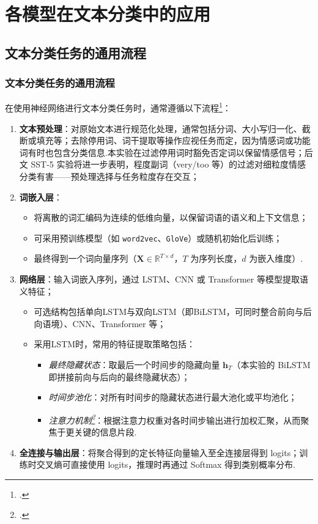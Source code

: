 \documentclass{模版}
\begin{document}
\section{各模型在文本分类中的应用}
\subsection{文本分类任务的通用流程}
\begin{frame}\frametitle{文本分类任务的通用流程}
\footnotesize
在使用神经网络进行文本分类任务时，通常遵循以下流程\footcite{raoActionablePoliticalText2016,wangLSTMApproachShort2018}：
\begin{enumerate}
    \item \textbf{文本预处理}：对原始文本进行规范化处理，通常包括分词、大小写归一化、截断或填充等；去除停用词、词干提取等操作应视任务而定，因为情感词或功能词有时也包含分类信息.本实验在过滤停用词时豁免否定词以保留情感信号；后文 SST-5 实验将进一步表明，程度副词（very/too 等）的过滤对细粒度情感分类有害——预处理选择与任务粒度存在交互；
    \item \textbf{词嵌入层}：
    \begin{itemize}
        \item 将离散的词汇编码为连续的低维向量，以保留词语的语义和上下文信息；
        \item 可采用预训练模型（如 \texttt{word2vec}、\texttt{GloVe}）或随机初始化后训练；
        \item 最终得到一个词向量序列（$\symbf{X}\in\mathbb{R}^{T\times d}$，$T$ 为序列长度，$d$ 为嵌入维度）.
    \end{itemize}
    \item \textbf{网络层}：输入词嵌入序列，通过 LSTM、CNN 或 Transformer 等模型提取语义特征；
    \begin{itemize}
        \item 可选结构包括单向LSTM与双向LSTM（即BiLSTM，可同时整合前向与后向语境）、CNN、Transformer 等；
        \item 采用LSTM时，常用的特征提取策略包括：
        \begin{itemize}
            \item \emph{最终隐藏状态}：取最后一个时间步的隐藏向量 $\symbf{h}_{T}$（本实验的 BiLSTM 即拼接前向与后向的最终隐藏状态）；
            \item \emph{时间步池化}：对所有时间步的隐藏状态进行最大池化或平均池化；
            \item \emph{注意力机制\footcite{baiTextClassificationBased2018}}：根据注意力权重对各时间步输出进行加权汇聚，从而聚焦于更关键的信息片段.
        \end{itemize}
    \end{itemize}
    \item \textbf{全连接与输出层}：将聚合得到的定长特征向量输入至全连接层得到 logits；训练时交叉熵可直接使用 logits，推理时再通过 Softmax 得到类别概率分布.
\end{enumerate}
\end{frame}
\end{document}
